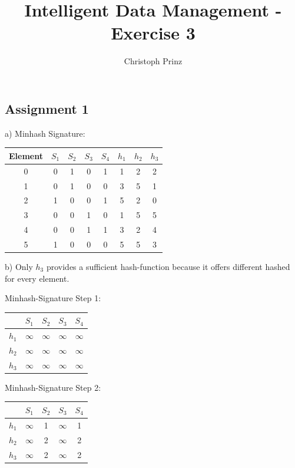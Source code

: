 \documentclass[]{scrartcl}
\title{Intelligent Data Management - Exercise 3}
\author{Christoph Prinz}
\begin{document}
\maketitle

\subsection*{Assignment 1}

a) Minhash Signature:\\

\begin{tabular}{c|c|c|c|c||c|c|c}
	Element & $S_1$ & $S_2$ & $S_3$  & $S_4$ & $h_1$ & $h_2$ & $h_3$  \\ 
	\hline\hline
	0 & 0 & 1 & 0 & 1 & 1  & 2 & 2 \\ 
	\hline 
	1 & 0 & 1 & 0 & 0 & 3 & 5  & 1 \\ 
	\hline 
	2 & 1 & 0 & 0 & 1 & 5 & 2 & 0  \\ 
	\hline 
	3 & 0 & 0 & 1 & 0 & 1 & 5 & 5 \\ 
	\hline 
	4 & 0 & 0 & 1 & 1 & 3 & 2 & 4 \\ 
	\hline 
	5 & 1 & 0 & 0 & 0 & 5 & 5 & 3 \\ 
\end{tabular}


\vspace{1cm}

b) Only $h_3$ provides a sufficient hash-function because it offers different hashed for every element. 

\vspace{1cm}

Minhash-Signature Step 1:\\
\begin{tabular}{c||c|c|c|c}
	& $S_1$ & $S_2$ & $S_3$ &$S_4$  \\ 
	\hline \hline
 $h_1$	& $\infty$ & $\infty$ & $\infty$ & $\infty$ \\ 
	\hline 
$h_2$	& $\infty$ & $\infty$ & $\infty$ & $\infty$ \\ 
	\hline 
$h_3$	& $\infty$ & $\infty$ & $\infty$ & $\infty$ \\ 
\end{tabular}

\vspace{1cm}

Minhash-Signature Step 2:\\
\begin{tabular}{c||c|c|c|c}
			& $S_1$ & $S_2$ & $S_3$ &$S_4$  \\ 
	\hline \hline
	$h_1$	&  $\infty$ & 1 & $\infty$ & 1 \\ 
	\hline 
	$h_2$	&  $\infty$ & 2 & $\infty$ & 2 \\ 
	\hline 
	$h_3$	&  $\infty$ & 2 & $\infty$ & 2 \\ 
\end{tabular} 
\end{document}
